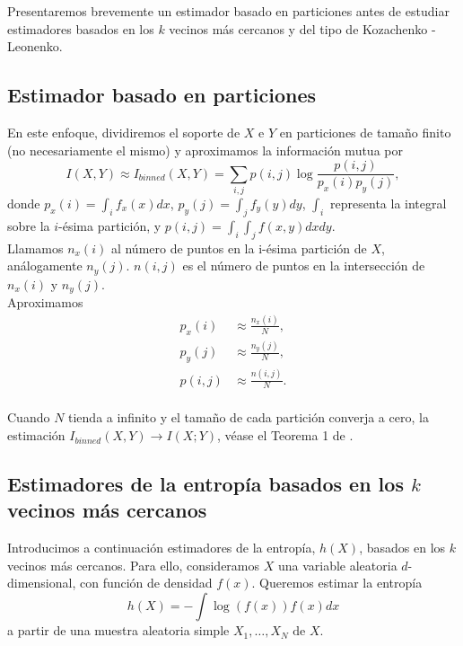 \documentclass[12pt,a4paper]{report} %
\theoremstyle{definition}
\begin{document}
Presentaremos brevemente un estimador basado en particiones antes de estudiar estimadores basados en los $k$ vecinos más cercanos y del tipo de Kozachenko - Leonenko.\\

\subsection{Estimador basado en particiones}

En este enfoque, dividiremos el soporte de $X$ e $Y$ en particiones de tamaño finito (no necesariamente el mismo) y aproximamos la información mutua por \[
I(X,Y) \approx I_{\textit{binned}}(X,Y) = \sum_{i,j} p(i,j) \log \frac{p(i,j)}{p_x(i)p_y(j)},
\]
donde $p_x(i) = \int_i f_x(x)dx$, $p_y(j) = \int_j f_y(y)dy$, $\int_i$ representa la integral sobre la $i$-ésima partición, y $p(i,j) = \int_i\int_jf(x,y)dxdy$.\\

Llamamos $n_x(i)$ al número de puntos en la i-ésima partición de $X$, análogamente $n_y(j)$. $n(i,j)$ es el número de puntos en la intersección de $n_x(i)$ y $n_y(j)$.\\

Aproximamos \begin{align*}
  p_x(i) &\approx \frac{n_x(i)}{N},\\
  p_y(j) &\approx \frac{n_y(j)}{N},\\
  p(i,j) &\approx \frac{n(i,j)}{N}.\\[-10pt]
  \end{align*}

Cuando $N$ tienda a infinito y el tamaño de cada partición converja a cero, la estimación $I_{\textit{binned}}(X,Y) \to I(X;Y)$, véase el Teorema 1 de \cite{paninski}.\\


\subsection{Estimadores de la entropía basados en los $k$ vecinos más cercanos}

Introducimos a continuación estimadores de la entropía, $h(X)$, basados en los $k$ vecinos más cercanos. Para ello, consideramos $X$ una variable aleatoria $d$-dimensional, con función de densidad $f(x)$. Queremos estimar la entropía\[
h(X) = - \int \log\left(f(x)\right)f(x)dx
\]
a partir de una muestra aleatoria simple $X_1,\dots,X_N \text{ de } X$.\\
\end{document}
